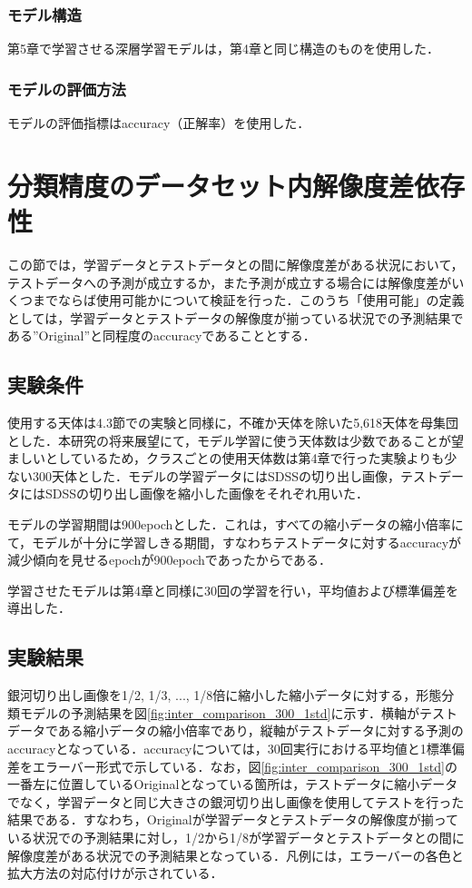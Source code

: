 \documentclass[a4j, 11pt]{jreport}
\begin{document}
\subsubsection{モデル構造}
第5章で学習させる深層学習モデルは，第4章と同じ構造のものを使用した．
 
\subsubsection{モデルの評価方法}
モデルの評価指標はaccuracy（正解率）を使用した．


\section{分類精度のデータセット内解像度差依存性}
この節では，学習データとテストデータとの間に解像度差がある状況において，テストデータへの予測が成立するか，また予測が成立する場合には解像度差がいくつまでならば使用可能かについて検証を行った．このうち「使用可能」の定義としては，学習データとテストデータの解像度が揃っている状況での予測結果である''Original''と同程度のaccuracyであることとする．

\subsection{実験条件}
使用する天体は4.3節での実験と同様に，不確か天体を除いた5,618天体を母集団とした．本研究の将来展望にて，モデル学習に使う天体数は少数であることが望ましいとしているため，クラスごとの使用天体数は第4章で行った実験よりも少ない300天体とした．モデルの学習データにはSDSSの切り出し画像，テストデータにはSDSSの切り出し画像を縮小した画像をそれぞれ用いた．

モデルの学習期間は900epochとした．これは，すべての縮小データの縮小倍率にて，モデルが十分に学習しきる期間，すなわちテストデータに対するaccuracyが減少傾向を見せるepochが900epochであったからである．

学習させたモデルは第4章と同様に30回の学習を行い，平均値および標準偏差を導出した．


\subsection{実験結果}
銀河切り出し画像を1/2, 1/3, ..., 1/8倍に縮小した縮小データに対する，形態分類モデルの予測結果を図\ref{fig:inter_comparison_300_1std}に示す．横軸がテストデータである縮小データの縮小倍率であり，縦軸がテストデータに対する予測のaccuracyとなっている．accuracyについては，30回実行における平均値と1標準偏差をエラーバー形式で示している．なお，図\ref{fig:inter_comparison_300_1std}の一番左に位置しているOriginalとなっている箇所は，テストデータに縮小データでなく，学習データと同じ大きさの銀河切り出し画像を使用してテストを行った結果である．すなわち，Originalが学習データとテストデータの解像度が揃っている状況での予測結果に対し，1/2から1/8が学習データとテストデータとの間に解像度差がある状況での予測結果となっている．凡例には，エラーバーの各色と拡大方法の対応付けが示されている．
\end{document}
